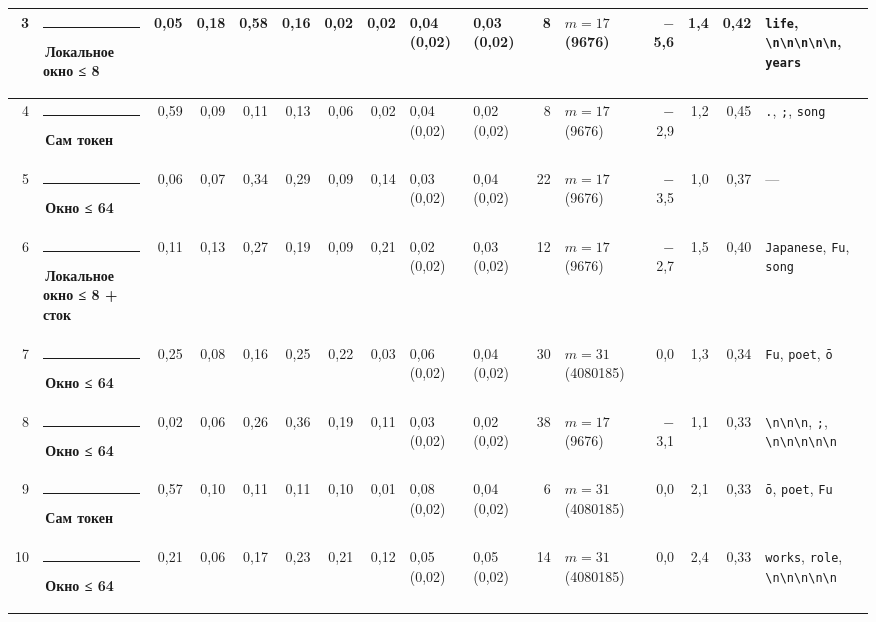 \documentclass[10pt]{article}
\begin{document}
\begin{minipage}{\linewidth}
\begin{center}
{\begin{tabular}{|r|l|r|r|r|r|r|r|l|l|r|l|r|r|r|l|}
3 & \textcolor[HTML]{1BAF7A}{\rule{0.62em}{0.62em}}\,\textbf{Локальное окно ≤ 8} & 0,05 & 0,18 & 0,58 & 0,16 & 0,02 & 0,02 & 0,04 (0,02) & 0,03 (0,02) & 8 & $m{=}17$ (9676) & $-$5,6 & 1,4 & 0,42 & \texttt{\textvisiblespace{}life}, \texttt{\textbackslash{}n\textbackslash{}n\textbackslash{}n\textbackslash{}n\textbackslash{}n}, \texttt{\textvisiblespace{}years} \\ \hline
4 & \textcolor[HTML]{2A78D6}{\rule{0.62em}{0.62em}}\,\textbf{Сам токен} & 0,59 & 0,09 & 0,11 & 0,13 & 0,06 & 0,02 & 0,04 (0,02) & 0,02 (0,02) & 8 & $m{=}17$ (9676) & $-$2,9 & 1,2 & 0,45 & \texttt{\textvisiblespace{}.}, \texttt{\textvisiblespace{};}, \texttt{\textvisiblespace{}song} \\ \hline
5 & \textcolor[HTML]{EDA100}{\rule{0.62em}{0.62em}}\,\textbf{Окно ≤ 64} & 0,06 & 0,07 & 0,34 & 0,29 & 0,09 & 0,14 & 0,03 (0,02) & 0,04 (0,02) & 22 & $m{=}17$ (9676) & $-$3,5 & 1,0 & 0,37 & — \\ \hline
6 & \textcolor[HTML]{1BAF7A}{\rule{0.62em}{0.62em}}\,\textbf{Локальное окно ≤ 8 + сток} & 0,11 & 0,13 & 0,27 & 0,19 & 0,09 & 0,21 & 0,02 (0,02) & 0,03 (0,02) & 12 & $m{=}17$ (9676) & $-$2,7 & 1,5 & 0,40 & \texttt{\textvisiblespace{}Japanese}, \texttt{\textvisiblespace{}Fu}, \texttt{\textvisiblespace{}song} \\ \hline
7 & \textcolor[HTML]{EDA100}{\rule{0.62em}{0.62em}}\,\textbf{Окно ≤ 64} & 0,25 & 0,08 & 0,16 & 0,25 & 0,22 & 0,03 & 0,06 (0,02) & 0,04 (0,02) & 30 & $m{=}31$ (4080185) & 0,0 & 1,3 & 0,34 & \texttt{\textvisiblespace{}Fu}, \texttt{\textvisiblespace{}poet}, \texttt{ō} \\ \hline
8 & \textcolor[HTML]{EDA100}{\rule{0.62em}{0.62em}}\,\textbf{Окно ≤ 64} & 0,02 & 0,06 & 0,26 & 0,36 & 0,19 & 0,11 & 0,03 (0,02) & 0,02 (0,02) & 38 & $m{=}17$ (9676) & $-$3,1 & 1,1 & 0,33 & \texttt{\textvisiblespace{}\textbackslash{}n\textbackslash{}n\textbackslash{}n}, \texttt{\textvisiblespace{};}, \texttt{\textbackslash{}n\textbackslash{}n\textbackslash{}n\textbackslash{}n\textbackslash{}n} \\ \hline
9 & \textcolor[HTML]{2A78D6}{\rule{0.62em}{0.62em}}\,\textbf{Сам токен} & 0,57 & 0,10 & 0,11 & 0,11 & 0,10 & 0,01 & 0,08 (0,02) & 0,04 (0,02) & 6 & $m{=}31$ (4080185) & 0,0 & 2,1 & 0,33 & \texttt{ō}, \texttt{\textvisiblespace{}poet}, \texttt{\textvisiblespace{}Fu} \\ \hline
10 & \textcolor[HTML]{EDA100}{\rule{0.62em}{0.62em}}\,\textbf{Окно ≤ 64} & 0,21 & 0,06 & 0,17 & 0,23 & 0,21 & 0,12 & 0,05 (0,02) & 0,05 (0,02) & 14 & $m{=}31$ (4080185) & 0,0 & 2,4 & 0,33 & \texttt{\textvisiblespace{}works}, \texttt{\textvisiblespace{}role}, \texttt{\textbackslash{}n\textbackslash{}n\textbackslash{}n\textbackslash{}n\textbackslash{}n} \\ \hline

\end{tabular}}
\end{center}
\end{minipage}
\end{document}
